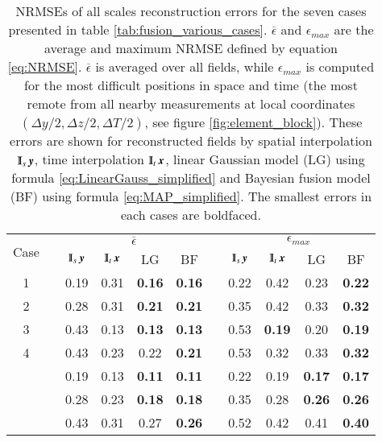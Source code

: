 \begin{table}
\caption{\label{tab:fusion_average_errors}
NRMSEs of all scales reconstruction errors for the seven cases presented in table \ref{tab:fusion_various_cases}. $\overline{\epsilon}$ and $\epsilon_{max}$ are the average and maximum NRMSE defined by equation \ref{eq:NRMSE}. $\overline{\epsilon}$ is averaged over all fields, while $\epsilon_{max}$ is computed for the most difficult positions in space and time (the most remote from all nearby measurements at local coordinates $ (\Delta y/2, \Delta z/2, \Delta T/2) $, see figure \ref{fig:element_block}). These errors are shown for reconstructed fields by spatial interpolation $ \Interp_s \y $, time interpolation $ \Interp_t \x $, linear Gaussian model (LG) using formula \ref{eq:LinearGauss_simplified} and Bayesian fusion model (BF) using formula \ref{eq:MAP_simplified}. The smallest errors in each cases are boldfaced.}
\vspace{.5cm}
\centering
	\begin{tabular}{ccccccccccc} 
		\toprule \multirow{2}{*}{Case}&\multicolumn{1}{c}{}&\multicolumn{4}{c}{$\overline{\epsilon}$}&\multicolumn{1}{c}{}&\multicolumn{4}{c}{$\epsilon_{max}$}\\
		\cmidrule{3-6} \cmidrule{8-11}
		 & & {$\Interp_s\y $} & {$\Interp_t\x $} & {LG} & {BF} & & {$\Interp_s\y $} & {$\Interp_t\x $} & {LG} & {BF}\\
		\midrule 
		1 & & 0.19 & 0.31 & {\textbf{0.16}} & {\textbf{0.16}} & & 0.22 & 0.42 &  {0.23} &  {\textbf{0.22}}\\
		2 & & 0.28 & 0.31 & {\textbf{0.21}} & {\textbf{0.21}} & & 0.35 & 0.42 & {0.33} &  {\textbf{0.32}}\\
		3 & & 0.43 & 0.13 & {\textbf{0.13}} & {\textbf{0.13}} & & 0.53 & {\textbf{0.19}} & {0.20} &  {\textbf{0.19}}\\
		4 & & 0.43 & 0.23 & {0.22} & {\textbf{0.21}} & & 0.53 & 0.32 & {0.33} &  {\textbf{0.32}}\\
		\myrowcolour
		5 & & 0.19 & 0.13 & {\textbf{0.11}} & {\textbf{0.11}} & & 0.22 & 0.19 &  {\textbf{0.17}} &  {\textbf{0.17}}\\ 
		\myrowcolour
		6 & & 0.28 & 0.23 & {\textbf{0.18}} & {\textbf{0.18}} & & 0.35 & 0.28 &  {\textbf{0.26}} &  {\textbf{0.26}}\\
		\myrowcolour
		7 & & 0.43 & 0.31 & {0.27} & {\textbf{0.26}} & & 0.52 & 0.42&  {0.41} &  {\textbf{0.40}} \\ \bottomrule
	\end{tabular}
\end{table}

